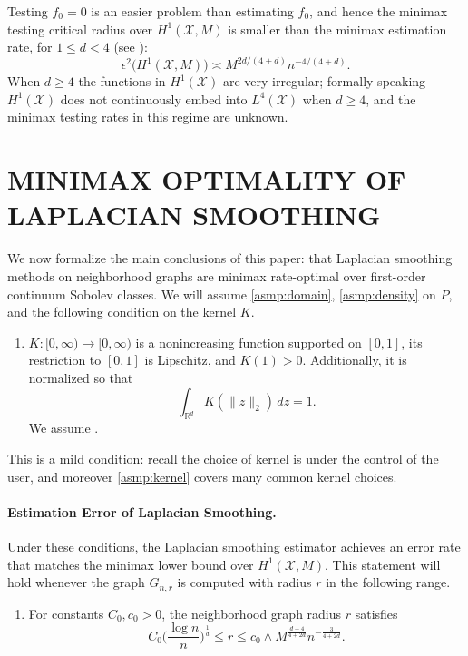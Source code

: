 \documentclass[twoside]{article}
\newcommand{\Reals}{\mathbb{R}}
\newcommand{\1}{\mathbf{1}}
\newcommand{\Rd}{\Reals^d}
\newcommand{\Xset}{\mathcal{X}}
\newcommand{\Leb}{L}
\newcommand{\wh}[1]{\widehat{#1}}
\theoremstyle{definition}
\theoremstyle{remark}
\begin{document}
Testing $f_0 = 0$ is an easier problem than estimating $f_0$, and hence the minimax testing critical radius over $H^1(\Xset,M)$ is smaller than the minimax estimation rate, for $1 \leq d < 4$ (see \citet{ingster2009}):
\begin{equation}
\label{eqn:sobolev_space_testing_critical_radius}
\epsilon^2\bigl(H^1(\Xset,M)\bigr) \asymp M^{2d/(4 + d)}n^{-4/(4 + d)}.
\end{equation}
When $d \geq 4$ the functions in $H^1(\Xset)$ are very irregular; formally speaking $H^1(\Xset)$ does not continuously embed into $\Leb^4(\Xset)$ when $d \geq 4$, and the minimax testing rates in this regime are unknown. 

\section{MINIMAX OPTIMALITY OF LAPLACIAN SMOOTHING}
\label{sec:minimax_optimal_laplacian_smoothing}

We now formalize the main conclusions of this paper: that Laplacian smoothing methods on neighborhood graphs are minimax rate-optimal over first-order continuum Sobolev classes. We will assume \ref{asmp:domain}, \ref{asmp:density} on $P$, and the following condition on the kernel $K$.
\begin{enumerate}[label=(K\arabic*)]
	\item
	\label{asmp:kernel}
	$K:[0,\infty) \to [0,\infty)$ is a nonincreasing function supported on $[0,1]$, its restriction to $[0,1]$ is Lipschitz, and $K(1) > 0$. Additionally, it is normalized so that
	\begin{equation*}
	\int_{\Rd} K(\|z\|_2) \,dz = 1.
	\end{equation*}
	We assume \smash{$\sigma_K = \frac{1}{d} \int_{\Rd} \|x\|_2^2 K(\|x\|_2) \,dx < \infty$}.
\end{enumerate}
This is a mild condition: recall the choice of kernel is under the control of the user, and moreover \ref{asmp:kernel} covers many common kernel choices.

\paragraph{Estimation Error of Laplacian Smoothing.} 

Under these conditions, the Laplacian smoothing estimator \smash{$\wh{f}$} achieves an error rate that matches the minimax lower bound over $H^1(\Xset,M)$. This statement will hold whenever the graph $G_{n,r}$ is computed with radius $r$ in the following range.
\begin{enumerate}[label=(R\arabic*)]
	\setcounter{enumi}{0}
	\item 
	\label{asmp:ls_kernel_radius_estimation}
	For constants $C_0,c_0>0$, the neighborhood graph radius $r$ satisfies
	\begin{equation*}
	C_0 \biggl(\frac{\log n}{n}\biggr)^{\frac{1}{d}} \leq r \leq c_0 \wedge M^{\frac{d - 4}{4 + 2d}} n^{-\frac{3}{4 + 2d}}.  
	\end{equation*}
\end{enumerate}
\end{document}
